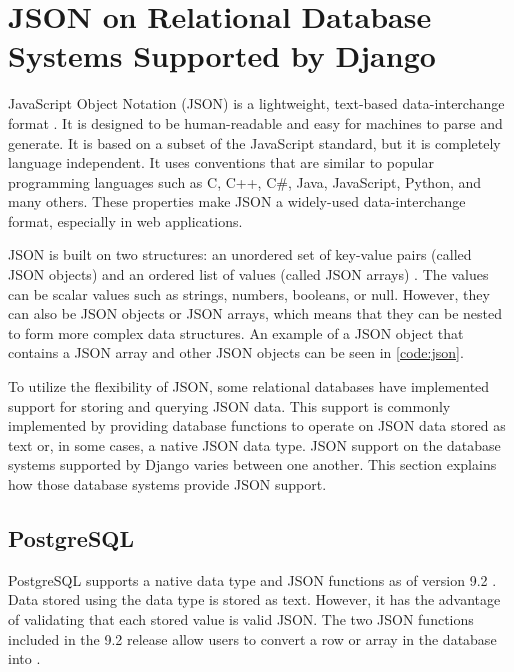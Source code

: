 \section{JSON on Relational Database Systems Supported by Django}

JavaScript Object Notation (JSON) is a lightweight, text-based data-interchange
format \cite{json}. It is designed to be human-readable and easy for machines
to parse and generate. It is based on a subset of the JavaScript standard, but
it is completely language independent. It uses conventions that are similar to
popular programming languages such as C, C++, C\#, Java, JavaScript, Python,
and many others. These properties make JSON a widely-used data-interchange
format, especially in web applications.

\noindent
\begin{minipage}{\linewidth}

\end{minipage}

JSON is built on two structures: an unordered set of key-value pairs (called
JSON objects) and an ordered list of values (called JSON arrays)
\cite{json:org}. The values can be scalar values such as strings, numbers,
booleans, or null. However, they can also be JSON objects or JSON arrays, which
means that they can be nested to form more complex data structures. An example
of a JSON object that contains a JSON array and other JSON objects can be seen
in \autoref{code:json}.

To utilize the flexibility of JSON, some relational databases have implemented
support for storing and querying JSON data. This support is commonly
implemented by providing database functions to operate on JSON data stored as
text or, in some cases, a native JSON data type. JSON support on the database
systems supported by Django varies between one another. This section explains
how those database systems provide JSON support.

\subsection{PostgreSQL}

PostgreSQL supports a native  data type and JSON functions as of
version 9.2 \cite{postgresql:9.2}. Data stored using the  data type
is stored as text. However, it has the advantage of validating that each stored
value is valid JSON. The two JSON functions included in the 9.2 release allow
users to convert a row or array in the database into .

